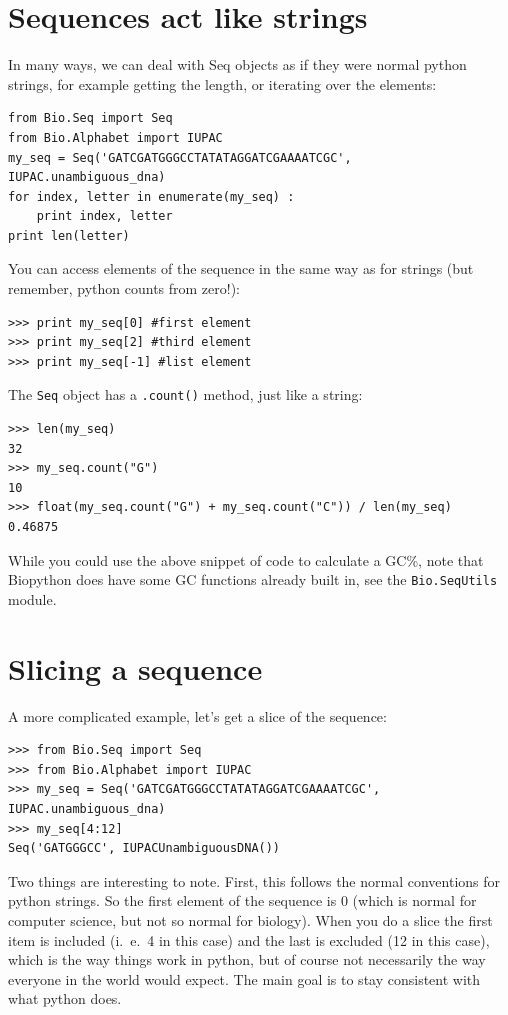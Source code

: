 \documentclass{report}
\begin{document}
\section{Sequences act like strings}

In many ways, we can deal with Seq objects as if they were normal python strings, for example getting the length, or iterating over the elements:

\begin{verbatim}
from Bio.Seq import Seq
from Bio.Alphabet import IUPAC
my_seq = Seq('GATCGATGGGCCTATATAGGATCGAAAATCGC', IUPAC.unambiguous_dna)
for index, letter in enumerate(my_seq) :
    print index, letter
print len(letter)
\end{verbatim}

You can access elements of the sequence in the same way as for strings (but remember, python counts from zero!):

\begin{verbatim}
>>> print my_seq[0] #first element
>>> print my_seq[2] #third element
>>> print my_seq[-1] #list element
\end{verbatim}

The \verb|Seq| object has a \verb|.count()| method, just like a string:

\begin{verbatim}
>>> len(my_seq)
32
>>> my_seq.count("G")
10
>>> float(my_seq.count("G") + my_seq.count("C")) / len(my_seq)
0.46875
\end{verbatim}

\noindent While you could use the above snippet of code to calculate a GC\%, note that Biopython does have some GC functions already built in, see the \verb|Bio.SeqUtils| module.

\section{Slicing a sequence}

A more complicated example, let's get a slice of the sequence:

\begin{verbatim}
>>> from Bio.Seq import Seq
>>> from Bio.Alphabet import IUPAC
>>> my_seq = Seq('GATCGATGGGCCTATATAGGATCGAAAATCGC', IUPAC.unambiguous_dna)
>>> my_seq[4:12]
Seq('GATGGGCC', IUPACUnambiguousDNA())
\end{verbatim}

Two things are interesting to note. First, this follows the normal conventions for python strings.  So the first element of the sequence is 0 (which is normal for computer science, but not so normal for biology). When you do a slice the first item is included (i.~e.~4 in this case) and the last is excluded (12 in this case), which is the way things work in python, but of course not necessarily the way everyone in the world would expect. The main goal is to stay consistent with what python does.
\end{document}
